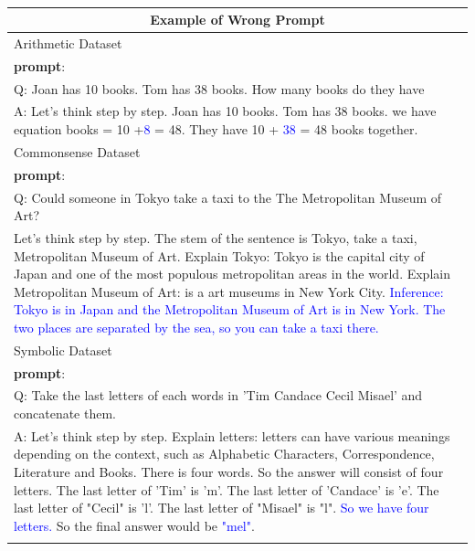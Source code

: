 \documentclass[11pt]{article}
\begin{document}
\begin{table}[th]
\caption{}
\small
  \begin{tabularx}{\textwidth}{X}
  \label{tabel2}
    \\\toprule
    \multicolumn{1}{c}{\textbf{Example of Wrong Prompt}} \\\midrule
    Arithmetic Dataset\\\midrule

\textbf{prompt}: \\
Q: Joan has 10 books. Tom has 38 books.  How many books do they have\\
A: Let's think step by step. Joan has 10 books. Tom has 38 books. we have equation books = 10 +\textcolor{blue}{8} = 48. They have 10 + \textcolor{blue}{38} = 48 books together.\\\midrule
Commonsense Dataset\\\midrule
\textbf{prompt}: \\
Q: Could someone in Tokyo take a taxi to the The Metropolitan Museum of Art?\\
Let's think step by step. The stem of the sentence is Tokyo, take a taxi, Metropolitan Museum of Art. Explain Tokyo: Tokyo is the capital city of Japan and one of the most populous metropolitan areas in the world. Explain Metropolitan Museum of Art: is a art museums in New York City. \textcolor{blue}{Inference: Tokyo is in Japan and the Metropolitan Museum of Art is in New York. The two places are separated by the sea, so you can take a taxi there.}\\\midrule
Symbolic Dataset\\\midrule
\textbf{prompt}: \\
Q: Take the last letters of each words in  'Tim Candace Cecil Misael' and concatenate them.\\
A: Let's think step by step. Explain letters: letters can have various meanings depending on the context, such as Alphabetic Characters, Correspondence, Literature and Books. There is four words. So the answer will consist of four letters. The last letter of 'Tim' is 'm'. The last letter of 'Candace' is 'e'. The last letter of "Cecil" is 'l'. The last letter of "Misael" is "l". \textcolor{blue}{So we have four letters.} So the final answer would be \textcolor{blue}{"mel"}.\\\bottomrule
    \label{table2}

\end{tabularx}
\end{table}
\end{document}
